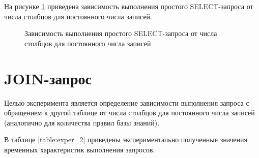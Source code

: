 На рисунке \ref{image:diagram_1} приведена зависимость выполнения простого SELECT-запроса от числа столбцов для постоянного числа записей.
\begin{figure}[H]
	\centering
	\captionsetup{justification=centering}
	\caption{Зависимость выполнения простого SELECT-запроса от числа столбцов для постоянного числа записей} 
	\label{image:diagram_1}
\end{figure} 

\section{JOIN-запрос}
\vspace{-0.5cm}
Целью эксперимента является определение зависимости выполнения запроса с обращением к другой таблице от числа столбцов для постоянного числа записей (аналогично для количества правил базы знаний). 

В таблице \ref{table:exper_2} приведены экспериментально полученные значения временных характеристик выполнения запросов.

